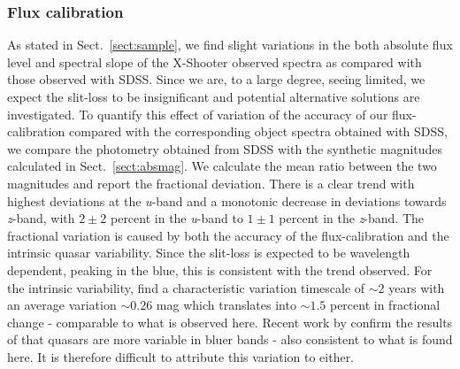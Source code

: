 \documentclass{aa}    %
\newcommand{\sectionname}{Sect.}
\newcommand{\Sect}[1]{\sectionname~\ref{sect:#1}}
\newcommand{\sect}[1]{\Sect{#1}}
\newcommand{\sectlabel}[1]{\label{sect:#1}}
\begin{document}
{\subsubsection{Flux calibration}  \sectlabel{Flux calibration}
As stated in \sect{sample}, we find slight variations in the both absolute flux level and spectral slope of the X-Shooter observed spectra as compared with those observed with SDSS. Since we are, to a large degree, seeing limited, we expect the slit-loss to be insignificant and potential alternative solutions are investigated. To quantify this effect of variation of the accuracy of our flux-calibration compared with the corresponding object spectra obtained with SDSS, we compare the photometry obtained from SDSS with the synthetic magnitudes calculated in \sect{absmag}. We calculate the mean ratio between the two magnitudes and report the fractional deviation. There is a clear trend with highest deviations at the \textit{u}-band and a monotonic decrease in deviations towards \textit{z}-band, with $2 \pm 2$ percent in the \textit{u}-band to $1 \pm 1$ percent in the \textit{z}-band. The fractional variation is caused by both the accuracy of the flux-calibration and the intrinsic quasar variability. Since the slit-loss is expected to be wavelength dependent, peaking in the blue, this is consistent with the trend observed. For the intrinsic variability, \cite{MacLeod2012} find a characteristic variation timescale of $\sim 2$ years with an average variation $\sim 0.26$ mag which translates into $\sim 1.5$ percent in fractional change - comparable to what is observed here. Recent work by \cite{Morganson2014} confirm the results of \cite{Helfand2001} that quasars are more variable in bluer bands - also consistent to what is found here. It is therefore difficult to attribute this variation to either. 


}
\end{document}
